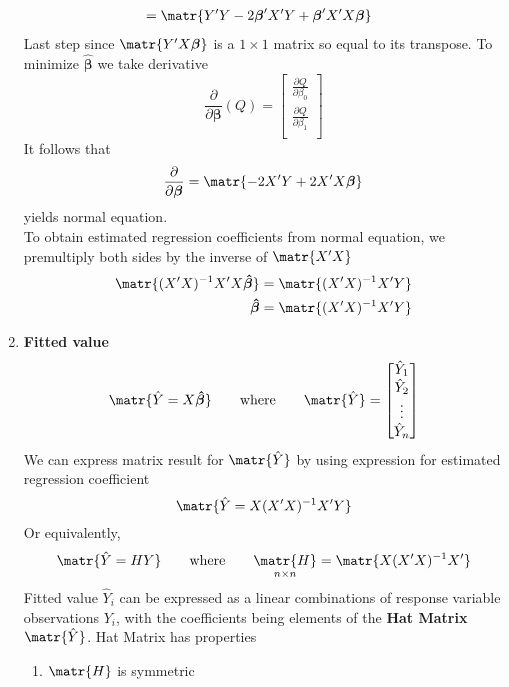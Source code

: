 \documentclass[11pt]{article}
\begin{document}
\begin{enumerate}
\begin{align*}
        &= \matr{Y'Y - 2\boldsymbol{\beta}' X' Y + \boldsymbol{\beta}' X' X \boldsymbol{\beta}}
    \end{align*}
    Last step since $\matr{Y'X\boldsymbol{\beta}}$ is a $1\times 1$ matrix so equal to its transpose. To minimize $\boldsymbol{\hat{\beta}}$ we take derivative 
    \[
        \frac{\partial}{\partial \boldsymbol{\beta}} (Q) = 
        \begin{bmatrix}
            \frac{\partial Q}{\partial \beta_0} \\
            \frac{\partial Q}{\partial \beta_1} \\ 
        \end{bmatrix}
    \]
    It follows that 
    \[
        \frac{\partial}{\partial \boldsymbol{\beta}} = 
        \matr{ -2X'Y + 2X'X\boldsymbol{\beta}}
    \]
    yields normal equation.\\
    To obtain estimated regression coefficients from normal equation, we premultiply both sides by the inverse of $\matr{X' X}$ 
    \begin{align*}
        \matr{(X'X)^{-1} X'X \boldsymbol{\hat{\beta}}} &= \matr{(X'X)^{-1}X'Y} \\
        \boldsymbol{\hat{\beta}} &= \matr{(X'X)^{-1}X'Y} \\
    \end{align*}
    \item \textbf{Fitted value} \\
    \[
        \matr{\hat{Y} = X \boldsymbol{\hat{\beta}}} 
        \quad \quad \text{where} \quad \quad 
        \matr{\hat{Y}} = 
        \begin{bmatrix}
            \hat{Y}_1 \\ \hat{Y}_2 \\ \vdots \\ \hat{Y}_n \\ 
        \end{bmatrix}
    \]
    We can express matrix result for $\matr{\hat{Y}}$ by using expression for estimated regression coefficient 
    \[
        \matr{\hat{Y} = X(X'X)^{-1}X'Y}
    \]
    Or equivalently,
    \[
        \matr{\hat{Y} = HY} 
        \quad \quad \text{where}\quad \quad 
        \underset{n\times n}{\matr{H}} = \matr{X(X'X)^{-1}X'}
    \]
    Fitted value $\hat{Y}_i$ can be expressed as a linear combinations of response variable observations $Y_i$, with the coefficients being elements of the \textbf{Hat Matrix} $\matr{\hat{Y}}$. Hat Matrix has properties 
    \begin{enumerate}
        \item $\matr{H}$ is symmetric 

\end{enumerate}
\end{enumerate}
\end{document}
